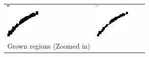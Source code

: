 \documentclass[preprint]{iucr}              %
\begin{document}
\begin{figure}
\begin{tabular}{>{\centering\arraybackslash}m{.1\linewidth}>{\centering\arraybackslash}m{.25\linewidth}>{\centering\arraybackslash}m{.25\linewidth}>{\centering\arraybackslash}m{.25\linewidth}}
\includegraphics[width=\linewidth]{Detail/Dilated.png}&
\includegraphics[width=\linewidth]{Detail/Thinned.png}
\\
Grown regions (Zoomed in)&

\end{tabular}
\end{figure}
\end{document}
